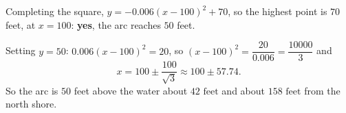 Completing the square, $y=-0.006(x-100)^2+70$, so the highest point is $70$ feet, at $x=100$: \textbf{yes}, the arc reaches $50$ feet.

Setting $y=50$: $0.006(x-100)^2=20$, so $(x-100)^2=\dfrac{20}{0.006}=\dfrac{10000}{3}$ and
\[x=100\pm\dfrac{100}{\sqrt3}\approx100\pm57.74.\]
So the arc is $50$ feet above the water about $\boxed{42\text{ feet}}$ and about $\boxed{158\text{ feet}}$ from the north shore.
